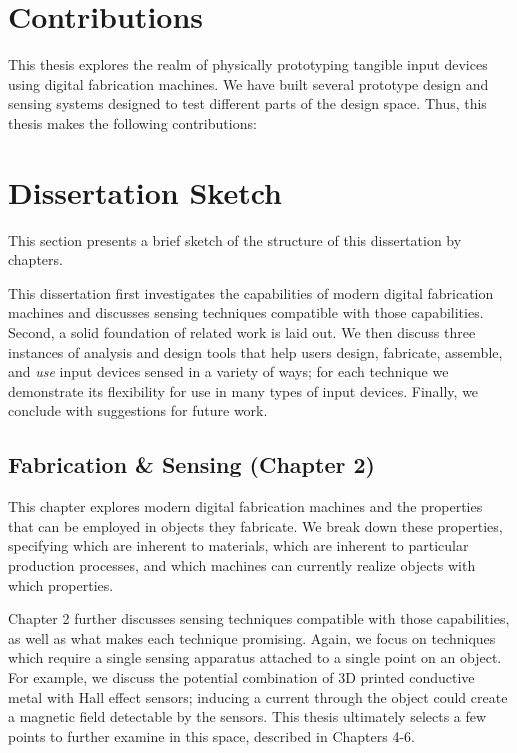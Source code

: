 \section{Contributions}

This thesis explores the realm of physically prototyping tangible input devices using digital fabrication machines. We have built several prototype design and sensing systems designed to test different parts of the design space. Thus, this thesis makes the following contributions:



\section{Dissertation Sketch}

This section presents a brief sketch of the structure of this dissertation by chapters.

This dissertation first investigates the capabilities of modern digital fabrication machines and discusses sensing techniques compatible with those capabilities. Second, a solid foundation of related work is laid out. We then discuss three instances of analysis and design tools that help users design, fabricate, assemble, and \emph{use} input devices sensed in a variety of ways; for each technique we demonstrate its flexibility for use in many types of input devices. Finally, we conclude with suggestions for future work.

\subsection{Fabrication \& Sensing (Chapter 2)}

This chapter explores modern digital fabrication machines and the properties that can be employed in objects they fabricate. We break down these properties, specifying which are inherent to materials, which are inherent to particular production processes, and which machines can currently realize objects with which properties.

Chapter 2 further discusses sensing techniques compatible with those capabilities, as well as what makes each technique promising. Again, we focus on techniques which require a single sensing apparatus attached to a single point on an object. For example, we discuss the potential combination of 3D printed conductive metal with Hall effect sensors; inducing a current through the object could create a magnetic field detectable by the sensors. This thesis ultimately selects a few points to further examine in this space, described in Chapters 4-6.

